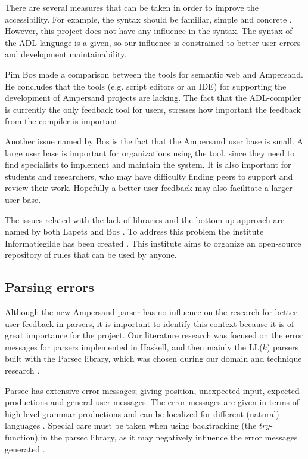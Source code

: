There are several measures that can be taken in order to improve the accessibility.
For example, the syntax should be familiar, simple and concrete .
However, this project does not have any influence in the syntax.
The syntax of the ADL language is a given, so our influence is constrained to better user errors and development maintainability.

Pim Bos  made a comparison between the tools for semantic web and Ampersand.
He concludes that the tools (e.g. script editors or an IDE) for supporting the development of Ampersand projects are lacking.
The fact that the ADL-compiler is currently the only feedback tool for users, stresses how important the feedback from the compiler is important.

Another issue named by Bos is the fact that the Ampersand user base is small.
A large user base is important for organizations using the tool, since they need to find specialists to implement and maintain the system.
It is also important for students and researchers, who may have difficulty finding peers to support and review their work.
Hopefully a better user feedback may also facilitate a larger user base.

The issues related with the lack of libraries and the bottom-up approach are named by both Lapets  and Bos .
To address this problem the institute Informatiegilde has been created .
This institute aims to organize an open-source repository of rules that can be used by anyone.

\subsection{Parsing errors}
Although the new Ampersand parser has no influence on the research for better user feedback in parsers, it is important to identify this context because it is of great importance for the project.
Our literature research was focused on the error messages for parsers implemented in Haskell, and then mainly the LL($k$) parsers built with the Parsec library, which was chosen during our domain and technique research .

Parsec has extensive error messages; giving position, unexpected input, expected productions and general user messages.
The error messages are given in terms of high-level grammar productions and can be localized for different (natural) languages .
Special care must be taken when using backtracking (the $try$-function) in the parsec library, as it may negatively influence the error messages generated .

